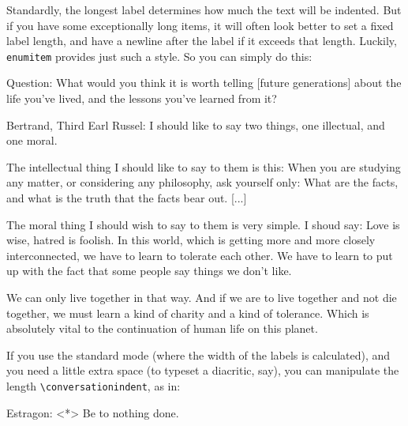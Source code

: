\documentclass{article}
\begin{document}
Standardly, the longest label determines how much the text will be indented. But 
if you have some exceptionally long items, it will often look better to set a 
fixed label length, and have a newline after the label if it exceeds
that length. Luckily, \verb|enumitem| provides just such a style. So you can 
simply do this:
\begin{examples}
    \item \begin{conversation}[leftmargin=2cm,style=nextline]
        \item[Question:] What would you think it is worth telling [future 
                         generations] about the life you've lived, and the 
                         lessons you've learned from it?
                         
        \item[Bertrand, Third Earl Russel:] 
              I should like to say two things, one illectual, and one moral.

              The intellectual thing I should like to say to them is this: When you
              are studying any matter, or considering any philosophy, ask yourself only:
              What are the facts, and what is the truth that the facts bear out. [...]

              The moral thing I should wish to say to them is very simple. I shoud say: Love is wise, hatred is foolish. In this world, which is getting more and
              more closely interconnected, we have to learn to tolerate each other. We
              have to learn to put up with the fact that some people say things we don't
              like. 

              We can only live together in that way. And if we are to live together and 
              not die together, we must learn a kind of charity and a kind of tolerance. 
              Which is absolutely vital to the continuation of human life on this planet.
                  \end{conversation}
\end{examples}
If you use the standard mode (where the width of the labels is calculated), and 
you need a little extra space (to typeset a diacritic, say),
you can manipulate the length \verb|\conversationindent|, as in:
\begin{example}
  \setlength{\conversationindent}{1em} %
  \item \begin{conversation}
        \item[Estragon:]<*> Be to nothing done.  
    \end{conversation}  
\end{example}
\end{document}
